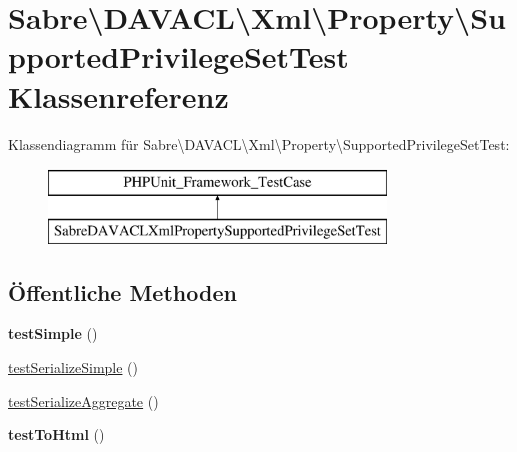 \hypertarget{class_sabre_1_1_d_a_v_a_c_l_1_1_xml_1_1_property_1_1_supported_privilege_set_test}{}\section{Sabre\textbackslash{}D\+A\+V\+A\+CL\textbackslash{}Xml\textbackslash{}Property\textbackslash{}Supported\+Privilege\+Set\+Test Klassenreferenz}
\label{class_sabre_1_1_d_a_v_a_c_l_1_1_xml_1_1_property_1_1_supported_privilege_set_test}
Klassendiagramm für Sabre\textbackslash{}D\+A\+V\+A\+CL\textbackslash{}Xml\textbackslash{}Property\textbackslash{}Supported\+Privilege\+Set\+Test\+:\begin{figure}[H]
\begin{center}
\leavevmode
\includegraphics[height=2.000000cm]{class_sabre_1_1_d_a_v_a_c_l_1_1_xml_1_1_property_1_1_supported_privilege_set_test}
\end{center}
\end{figure}
\subsection*{Öffentliche Methoden}
\begin{DoxyCompactItemize}
\item 
\mbox{\label{class_sabre_1_1_d_a_v_a_c_l_1_1_xml_1_1_property_1_1_supported_privilege_set_test_ad07a194058a5077f38a5a59d38d1b45d}} 
{\bfseries test\+Simple} ()
\item 
\mbox{\hyperlink{class_sabre_1_1_d_a_v_a_c_l_1_1_xml_1_1_property_1_1_supported_privilege_set_test_ae75377ccd18999a83c3ff2c544930d02}{test\+Serialize\+Simple}} ()
\item 
\mbox{\hyperlink{class_sabre_1_1_d_a_v_a_c_l_1_1_xml_1_1_property_1_1_supported_privilege_set_test_a8b2dce83b761561ff96d68a3e3766f60}{test\+Serialize\+Aggregate}} ()
\item 
\mbox{\label{class_sabre_1_1_d_a_v_a_c_l_1_1_xml_1_1_property_1_1_supported_privilege_set_test_a81813faa6a491580b6008f0ce18fd14a}} 
{\bfseries test\+To\+Html} ()
\end{DoxyCompactItemize}


